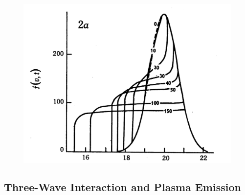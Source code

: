 \begin{figure}[!t]
\begin{center}
\includegraphics[scale=0.35, trim = 4cm 0cm 0cm 0cm]{images/Grognard1975}
\end{center}
\end{figure}


\subsection{Three-Wave Interaction and Plasma Emission}\label{sec:32}

